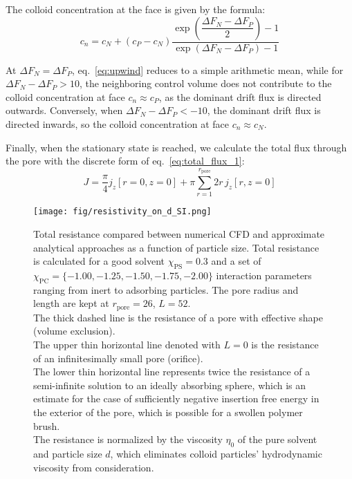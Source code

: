 \documentclass[10pt, a4paper]{article}
\begin{document}
\begin{multicols}{2}
The colloid concentration at the face is given by the formula:
\begin{equation}
    \label{eq:upwind}
    c_n = c_N + (c_P - c_N) \frac{\exp\left( \dfrac{\Delta F_N - \Delta F_P}{2} \right) - 1}{\exp\left( \Delta F_N - \Delta F_P \right) - 1}
\end{equation}

At $\Delta F_N = \Delta F_P$, eq.~\ref{eq:upwind} reduces to a simple arithmetic mean, while for $\Delta F_N - \Delta F_P > 10$, the neighboring control volume does not contribute to the colloid concentration at face $c_n \approx c_P$, as the dominant drift flux is directed outwards.
Conversely, when $\Delta F_N - \Delta F_P < -10$, the dominant drift flux is directed inwards, so the colloid concentration at face $c_n \approx c_N$.




Finally, when the stationary state is reached, we calculate the total flux through the pore with the discrete form of eq.~\ref{eq:total_flux_1}:
\begin{equation}
    \label{eq:total_flux_2}
    J = \frac{\pi}{4} j_z[ r = 0, z = 0 ] + \pi \sum_{r = 1}^{r_\textrm{pore}} 2 r \, j_z[ r, z = 0 ]
\end{equation}

\begin{figure}[H]
    \centering
    \texttt{[image: fig/resistivity\_on\_d\_SI.png]}
    \caption{
        Total resistance compared between numerical CFD and approximate analytical approaches as a function of particle size.
        Total resistance is calculated for a good solvent $\chi_{\textrm{PS}} = 0.3$ and a set of $\chi_{\textrm{PC}} = \{-1.00, -1.25, -1.50, -1.75, -2.00\}$ interaction parameters ranging from inert to adsorbing particles.
        The pore radius and length are kept at $r_{\textrm{pore}} = 26$, $L = 52$.
        \\
        The thick dashed line is the resistance of a pore with effective shape (volume exclusion).
        \\
        The upper thin horizontal line denoted with $L = 0$ is the resistance of an infinitesimally small pore (orifice).
        \\
        The lower thin horizontal line represents twice the resistance of a semi-infinite solution to an ideally absorbing sphere, which is an estimate for the case of sufficiently negative insertion free energy in the exterior of the pore, which is possible for a swollen polymer brush.
        \\
        The resistance is normalized by the viscosity $\eta_{0}$ of the pure solvent and particle size $d$, which eliminates colloid particles' hydrodynamic viscosity from consideration.
        }
    \label{fig:CFD_comparison}
\end{figure}


\end{multicols}
\end{document}
